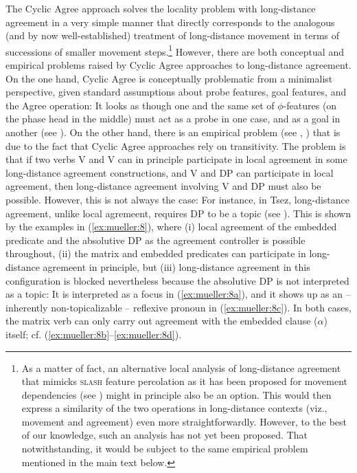 \documentclass[output=paper
,modfonts
,nonflat]{langsci/langscibook}
\begin{document}
	The Cyclic Agree approach solves the locality problem with long-distance\linebreak
	agreement in a very simple manner that directly
	corresponds to the analogous (and by now well-established) treatment
	of long-distance movement in terms of successions of smaller movement
	steps.\footnote{As a matter of fact, an alternative local analysis of long-distance agreement that mimicks {\scshape slash} feature percolation as it has been proposed for movement dependencies (see \citealt{Gazdar:81}) might in principle also be an option. This would then express a similarity of the two operations in long-distance contexts (viz., movement and agreement) even more straightforwardly. However, to the best of our knowledge, such an analysis has not yet been proposed. That notwithstanding, it would be subject to the same empirical problem mentioned in the main text below.}  However, there are both conceptual and empirical problems
	raised by Cyclic Agree approaches to long-distance agreement. On the
	one hand, Cyclic Agree is conceptually problematic from a minimalist
	perspective, given standard assumptions about probe features, goal
	features, and the Agree operation: It looks as though one and the same
	set of $\phi$-features (on the phase head in the middle) must act as a
	probe in one case, and as a goal in another (see \citealt{Bhatt:05}). On
	the other hand, there is an empirical problem (see
	\citealt{PolinskyPotsdam:01}, \citealt{BhattKeine:16:lon}) that is due to the
	fact that Cyclic Agree approaches rely on transitivity. The problem is
	that if two verbs V and V can in principle participate in local
	agreement in some long-distance agreement constructions, and V and
	DP can participate in local agreement, then long-distance
	agreement involving V and DP must also be possible. However,
	this is not always the  case: For instance,  in Tsez, long-distance
	agreement, unlike local agremeent, requires DP to
	be a topic (see \citealt{PolinskyPotsdam:01}). This is shown by the
	examples in (\ref{ex:mueller:8}), where (i) local agreement of the embedded predicate and
	the absolutive DP as the agreement controller is possible throughout,
	(ii) the matrix and embedded predicates can participate in
	long-distance agremeent in principle, but (iii) long-distance
	agreement in this configuration is blocked nevertheless because the
	absolutive DP is not interpreted as a topic: It is interpreted as a
	focus in (\ref{ex:mueller:8a}), and it shows up as an -- inherently
	non-topicalizable -- reflexive pronoun in (\ref{ex:mueller:8c}). In both cases, the
	matrix verb can only carry out agreement with the embedded clause
	($\alpha$) itself; cf. (\ref{ex:mueller:8b}--\ref{ex:mueller:8d}). 
	
\end{document}
